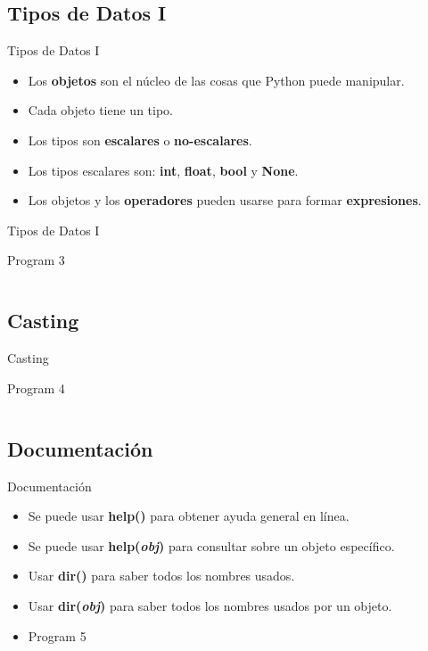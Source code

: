\documentclass[usenames, dvipsnames, compress]{beamer}
\begin{document}
	\subsection{Tipos de Datos I}
	\begin{frame}{Tipos de Datos I}
		\begin{itemize}[<+- | alert@ +>]
			\item Los \textbf{objetos} son el núcleo de las cosas que Python puede manipular.
			\item Cada objeto tiene un tipo.
			\item Los tipos son \textbf{escalares} o \textbf{no-escalares}.
			\item Los tipos escalares son: \textbf{int}, \textbf{float}, \textbf{bool} y \textbf{None}.
			\item Los objetos y los \textbf{operadores} pueden usarse para formar \textbf{expresiones}.
		\end{itemize}
	\end{frame}
	\begin{frame}{Tipos de Datos I}
		\begin{block}{Program 3}
			\inputminted[xleftmargin=\parindent,linenos]{python}{codes/program3.py}
		\end{block}
	\end{frame}
	\subsection{Casting}
	\begin{frame}{Casting}
		\begin{block}{Program 4}
			\inputminted[xleftmargin=\parindent,linenos]{python}{codes/program4.py}
		\end{block}
	\end{frame}
	\subsection{Documentación}
		\begin{frame}{Documentación}
			\begin{itemize}
				\item Se puede usar \textbf{help()} para obtener ayuda general en línea.
				\pause
				\item Se puede usar \textbf{help(\textit{obj})} para consultar sobre un objeto específico.
				\pause
				\item Usar \textbf{dir()} para saber todos los nombres usados.
				\pause
				\item Usar \textbf{dir(\textit{obj})} para saber todos los nombres usados por un objeto.
				\pause
				\item [] 
				\begin{block}{Program 5}
					\inputminted[xleftmargin=\parindent,linenos]{python}{codes/program5.py}
				\end{block}
			\end{itemize}
		\end{frame}
\end{document}
